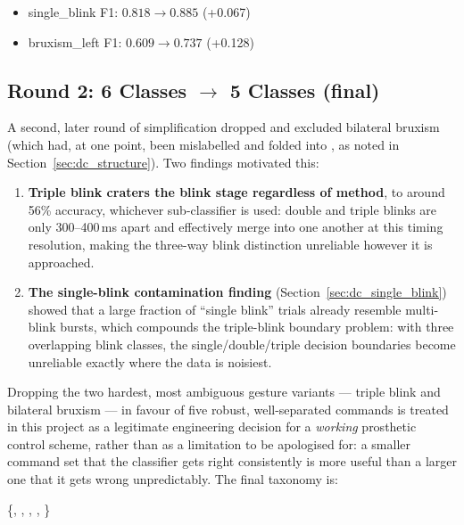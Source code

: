 \begin{itemize}[leftmargin=*]
    \item single\_blink F1: $0.818 \rightarrow 0.885$ (+0.067)
    \item bruxism\_left F1: $0.609 \rightarrow 0.737$ (+0.128)
\end{itemize}

\subsection{Round 2: 6 Classes $\rightarrow$ 5 Classes (final)}

A second, later round of simplification dropped
 and excluded bilateral bruxism (which had,
at one point, been mislabelled and folded into , as
noted in Section~\ref{sec:dc_structure}). Two findings motivated
this:

\begin{enumerate}[leftmargin=*]
    \item \textbf{Triple blink craters the blink stage regardless
    of method}, to around 56\% accuracy, whichever sub-classifier
    is used: double and triple blinks are only 300--400\,ms apart
    and effectively merge into one another at this timing
    resolution, making the three-way blink distinction unreliable
    however it is approached.
    \item \textbf{The single-blink contamination finding}
    (Section~\ref{sec:dc_single_blink}) showed that a large
    fraction of ``single blink'' trials already resemble
    multi-blink bursts, which compounds the triple-blink boundary
    problem: with three overlapping blink classes, the
    single/double/triple decision boundaries become unreliable
    exactly where the data is noisiest.
\end{enumerate}

Dropping the two hardest, most ambiguous gesture variants ---
triple blink and bilateral bruxism --- in favour of five robust,
well-separated commands is treated in this project as a
legitimate engineering decision for a \emph{working} prosthetic
control scheme, rather than as a limitation to be apologised for:
a smaller command set that the classifier gets right consistently
is more useful than a larger one that it gets wrong
unpredictably. The final taxonomy is:

\begin{center}
\{, , ,
, \}
\end{center}

